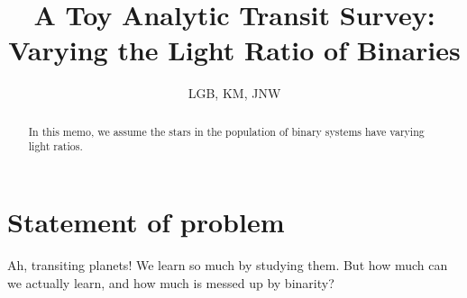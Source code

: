 \documentclass{emulateapj}
\begin{document}
%
\def\ltsima{$\; \buildrel < \over \sim \;$}
\def\lsim{\lower.5ex\hbox{\ltsima}}
\def\gtsima{$\; \buildrel > \over \sim \;$}
\def\gsim{\lower.5ex\hbox{\gtsima}}
\def\tess{{\it TESS} }
\def \teff {T_{\rm eff}}
\def \phir {\Phi_{\rm R}}
\def \fov {24$^{\circ}$}
\def \pixsz {21.1''}
\def \aeff {69.1 cm$^2$ }    
\def \epd {105 mm}                          
                                                                                          
%



\title{ A Toy Analytic Transit Survey: Varying the Light Ratio of Binaries }

\author{
  LGB, KM, JNW
}



\begin{abstract}

In this memo, we assume the stars in the population of binary systems have 
varying light ratios.

\end{abstract}


\section*{Statement of problem}

Ah, transiting planets! We learn so much by studying them. But how much can we 
actually learn, and how much is messed up by binarity?
\end{document}
